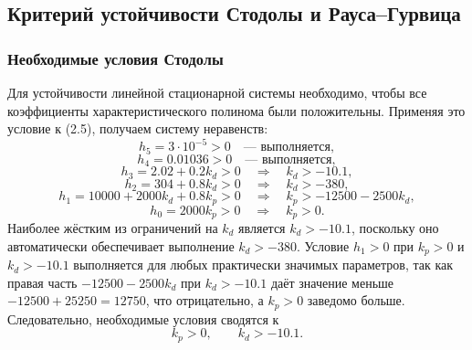 \documentclass[a4paper, 14pt]{extarticle}
\begin{document}
    \subsection{Критерий устойчивости Стодолы и Рауса–Гурвица}

    \subsubsection{Необходимые условия Стодолы}
    Для устойчивости линейной стационарной системы необходимо, чтобы все коэффициенты характеристического полинома были положительны. Применяя это условие к (2.5), получаем систему неравенств:
    \[
    h_5 = 3\cdot10^{-5} > 0 \quad\text{— выполняется},
    \]
    \[
    h_4 = 0.01036 > 0 \quad\text{— выполняется},
    \]
    \[
    h_3 = 2.02 + 0.2 k_d > 0 \quad\Rightarrow\quad k_d > -10.1,
    \]
    \[
    h_2 = 304 + 0.8 k_d > 0 \quad\Rightarrow\quad k_d > -380,
    \]
    \[
    h_1 = 10000 + 2000 k_d + 0.8 k_p > 0 \quad\Rightarrow\quad k_p > -12500 - 2500 k_d,
    \]
    \[
    h_0 = 2000 k_p > 0 \quad\Rightarrow\quad k_p > 0.
    \]
    Наиболее жёстким из ограничений на $k_d$ является $k_d > -10.1$, поскольку оно автоматически обеспечивает выполнение $k_d > -380$. Условие $h_1>0$ при $k_p>0$ и $k_d>-10.1$ выполняется для любых практически значимых параметров, так как правая часть $-12500-2500k_d$ при $k_d > -10.1$ даёт значение меньше $-12500+25250=12750$, что отрицательно, а $k_p>0$ заведомо больше. Следовательно, необходимые условия сводятся к
    \[
    k_p > 0,\qquad k_d > -10.1. \tag{2.6}
    \]
\end{document}
